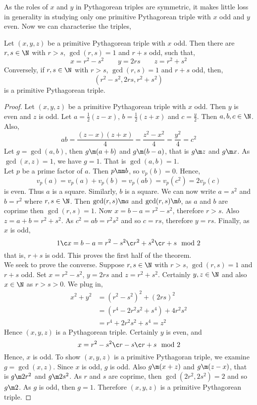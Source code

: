 \noindent
As the roles of $x$ and $y$ in Pythagorean triples are symmetric, it makes little loss in generality in studying only one primitive Pythagorean triple with $x$ odd and $y$ even. Now we can characterise the triples,
\begin{nthm}
  Let $(x, y, z)$ be a primitive Pythagorean triple with $x$ odd. Then there are $r, s \in \N$ with $r > s$, $\gcd(r, s) = 1$ and $r + s$ odd, such that,
  $$ x = r^2 - s^2 \qquad y = 2rs \qquad z = r^2 + s^2 $$
  Conversely, if $r, s \in \N$ with $r > s$, $\gcd(r, s) = 1$ and $r + s$ odd, then,
  $$ (r^2 - s^2, 2rs, r^2 + s^2) $$
  is a primitive Pythagorean triple.
\end{nthm}
\begin{proof}
  Let $(x, y, z)$ be a primitive Pythagorean triple with $x$ odd. Then $y$ is even and $z$ is odd. Let $a = \frac{1}{2}(z - x)$, $b = \frac{1}{2}(z + x)$ and $c = \frac{y}{2}$. Then $a, b, c \in \N$. Also,
  $$ ab = \frac{(z - x)(z + x)}{4} = \frac{z^2 - x^2}{4} = \frac{y^2}{4} = c^2 $$
  Let $g = \gcd(a, b)$, then $g \m (a + b)$ and $g \m (b - a)$, that is $g \m z$ and $g \m x$. As $\gcd(x, z) = 1$, we have $g = 1$. That is $\gcd(a, b) = 1$.\\

  \noindent
  Let $p$ be a prime factor of $a$. Then $p \nm b$, so $v_p(b) = 0$. Hence,
  $$ v_p(a) = v_p(a) + v_p(b) = v_p(ab) = v_p(c^2) = 2v_p(c) $$
  is even. Thus $a$ is a square. Similarly, $b$ is a square. We can now write $a = s^2$ and $b = r^2$ where $r, s \in \N$. Then $\gcd(r, s) \m a$ and $\gcd(r, s) \m b$, as $a$ and $b$ are coprime then $\gcd(r, s) = 1$. Now $x = b - a = r^2 - s^2$, therefore $r > s$. Also $z = a + b = r^2 + s^2$. As $c^2 = ab = r^2s^2$ and so $c = rs$, therefore $y = rs$. Finally, as $x$ is odd,
  $$ 1 \c x = b - a = r^2 - s^2 \c r^2 + s^2 \c r + s \mod 2 $$
  that is, $r + s$ is odd. This proves the first half of the theorem.\\

  \noindent
  We seek to prove the converse. Suppose $r, s \in \N$ with $r > s$, $\gcd(r,s) = 1$ and $r + s$ odd. Set $x = r^2 - s^2$, $y = 2rs$ and $z = r^2 + s^2$. Certainly $y, z \in \N$ and also $x \in \N$ as $r > s > 0$. We plug in,
  \begin{align*}
    x^2 + y^2 &= (r^2 - s^2)^2 + (2rs)^2\\
    &= (r^4 - 2r^2s^2 + s^4) + 4r^2s^2 \\
    &= r^4 + 2r^2s^2 + s^4 = z^2
  \end{align*}
  Hence $(x, y, z)$ is a Pythagorean triple. Certainly $y$ is even, and
  $$ x = r^2 - s^2 \c r - s \c r + s \mod 2 $$
  Hence, $x$ is odd. To show $(x, y, z)$ is a primitive Pythagoran triple, we examine $g = \gcd(x, z)$. Since $x$ is odd, $g$ is odd. Also $g \m (x + z)$ and $g \m (z - x)$, that is $g \m 2r^2$ and $g \m 2s^2$. As $r$ and $s$ are coprime, then $\gcd(2r^2, 2s^2) = 2$ and so $g \m 2$. As $g$ is odd, then $g = 1$. Therefore $(x, y, z)$ is a primitive Pythagorean triple.
\end{proof}


